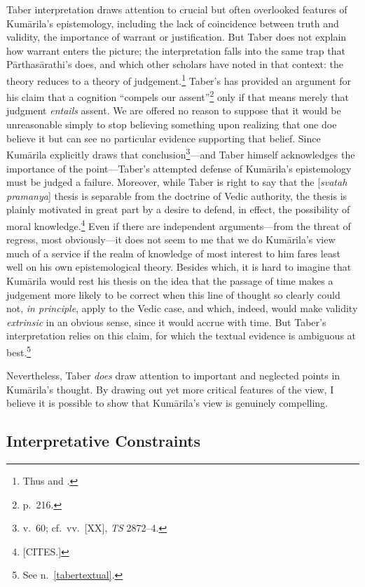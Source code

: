 ﻿\documentclass[11pt]{amsart}
\begin{document}
Taber interpretation draws attention to crucial but often overlooked features of Kum\=arila's epistemology, including the lack of coincidence between truth and validity, the importance of warrant or justification. But Taber does not explain how warrant enters the picture; the interpretation falls into the same trap that P\=arthas\=arathi's does, and which other scholars have noted in that context: the theory reduces to a theory of judgement.\footnote{Thus \citet[p.~8]{mohanty1989gangesa} and \citet[p.~52]{chatterjea2003svatah}.} Taber's has provided an argument for his claim that a cognition ``compels our assent''\footnote{p.~216.} only if that means merely that judgment \emph{entails} assent. We are offered no reason to suppose that it would be unreasonable simply to stop believing something upon realizing that one doe believe it but can see no particular evidence supporting that belief. Since Kum\=arila explicitly draws that conclusion\footnote{v.~60; cf.~vv.~[XX], \emph{TS} 2872--4.\label{reasonableness}}---and Taber himself acknowledges the importance of the point---Taber's attempted defense of Kum\=arila's epistemology must be judged a failure. Moreover, while Taber is right to say that the [\emph{svatah pramanya}] thesis is separable from the doctrine of Vedic authority, the thesis is plainly motivated in great part by a desire to defend, in effect, the possibility of moral knowledge.\footnote{[CITES.]} Even if there are independent arguments---from the threat of regress, most obviously---it does not seem to me that we do Kum\=arila's view much of a service if the realm of knowledge of most interest to him fares least well on his own epistemological theory. Besides which, it is hard to imagine that Kum\=arila would rest his thesis on the idea that the passage of time makes a judgement more likely to be correct when this line of thought so clearly could not, \emph{in principle}, apply to the Vedic case, and which, indeed, would make validity \emph{extrinsic} in an obvious sense, since it would accrue with time. But Taber's interpretation relies on this claim, for which the textual evidence is ambiguous at best.\footnote{See n.~\ref{tabertextual}.}

Nevertheless, Taber \emph{does} draw attention to important and neglected points in Kum\=arila's thought. By drawing out yet more critical features of the view, I believe it is possible to show that Kum\=arila's view is genuinely compelling.

\subsection{Interpretative Constraints} \label{constraints}
\end{document}
